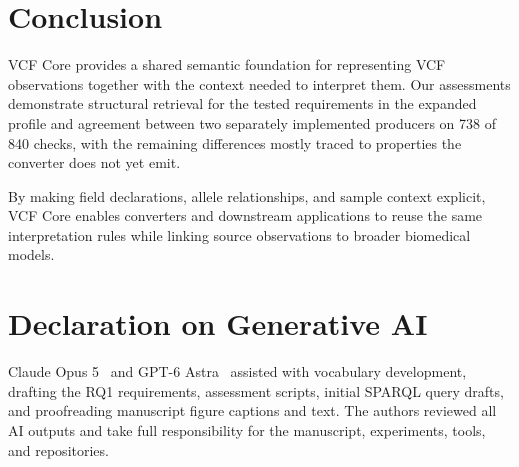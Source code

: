 \documentclass{ceurart}
\begin{document}








\section{Conclusion}

VCF Core provides a shared semantic foundation for representing VCF observations together with the context needed to interpret them. 
Our assessments demonstrate structural retrieval for the tested requirements in the expanded profile and agreement between two separately implemented producers on 738 of 840 checks, with the remaining differences mostly traced to properties the converter does not yet emit.

By making field declarations, allele relationships, and sample context explicit, VCF Core enables converters and downstream applications to reuse the same interpretation rules while linking source observations to broader biomedical models. 



\section*{Declaration on Generative AI}
Claude Opus 5~\cite{anthropic2026claudeopus5} and GPT-6 Astra~\cite{openai2026gpt6astra} assisted with vocabulary development, drafting the RQ1 requirements, assessment scripts, initial SPARQL query drafts, and proofreading manuscript figure captions and text. The authors reviewed all AI outputs and take full responsibility for the manuscript, experiments, tools, and repositories.

\label{endofmain}

{
}
\end{document}

